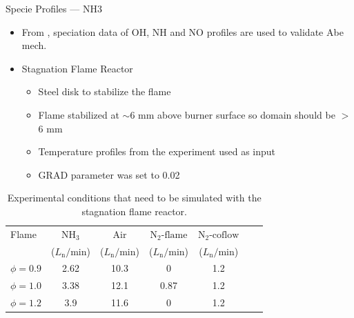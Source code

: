 \documentclass[11pt]{beamer}
\begin{document}
\begin{frame}{Specie Profiles --- NH3}
	\begin{itemize}
		\item From \cite{brackmannStructurePremixedAmmonia2016a}, speciation data of OH, NH and NO profiles are used to validate Abe mech.
		\item Stagnation Flame Reactor
		\begin{itemize}
			\item Steel disk to stabilize the flame
			\item Flame stabilized at $\sim$6 mm above burner surface so domain should be $>$ 6 mm
			\item Temperature profiles from the experiment used as input
			\item GRAD parameter was set to 0.02
		\end{itemize}
	\end{itemize}
	\begin{table}
		\caption{Experimental conditions that need to be simulated with the stagnation flame reactor. }
		\centering
		\small
		\setlength{\tabcolsep}{3pt}
		\begin{tabularx}{\textwidth}{@{} l *{6}{C} @{}}
		\toprule
        Flame & {$\text{NH}_3$} & {Air} & {$\text{N}_2\text{-flame}$} & {$\text{N}_2\text{-coflow}$} \\
              & {($L_{\text{n}}/\text{min}$)} & {($L_{\text{n}}/\text{min}$)} & {($L_{\text{n}}/\text{min}$)} & {($L_{\text{n}}/\text{min}$)} \\
        \midrule
        $\phi = 0.9$ & 2.62 & 10.3 & 0    & 1.2 \\
        $\phi = 1.0$ & 3.38 & 12.1 & 0.87 & 1.2 \\
        $\phi = 1.2$ & 3.9  & 11.6 & 0    & 1.2 \\
        \bottomrule
		\end{tabularx}
	\end{table}
\end{frame}
\end{document}
